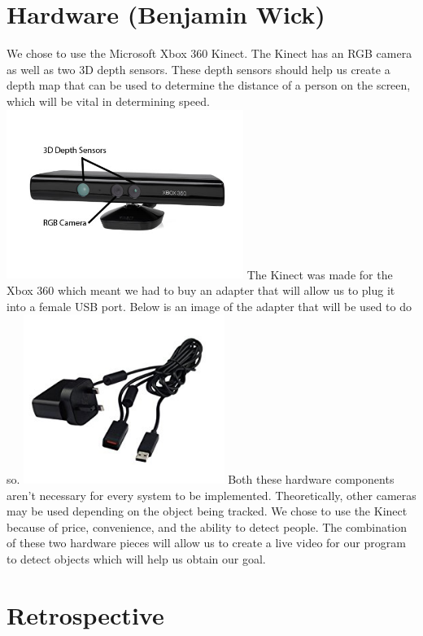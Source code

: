\documentclass[onecolumn, draftclsnofoot,10pt, compsoc]{IEEEtran}
\begin{document}
\section{Hardware (Benjamin Wick)}
We chose to use the Microsoft Xbox 360 Kinect. The Kinect has an RGB camera as well as two 3D depth sensors. These depth sensors should help us create a depth map that can be used to determine the distance of a person on the screen, which will be vital in determining speed.
\newline
\includegraphics[height=5.5cm]{kinect1}
\newline
The Kinect was made for the Xbox 360 which meant we had to buy an adapter that will allow us to plug it into a female USB port. Below is an image of the adapter that will be used to do so.
\newline
\includegraphics[height=5.5cm]{adapter}
\newline
Both these hardware components aren't necessary for every system to be implemented.
Theoretically, other cameras may be used depending on the object being tracked.
We chose to use the Kinect because of price, convenience, and the ability to detect people.
The combination of these two hardware pieces will allow us to create a live video for our program to detect objects which will help us obtain our goal.



\section{Retrospective}
\end{document}
